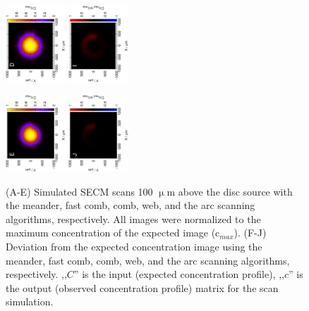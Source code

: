 \documentclass[3p]{elsarticle}
\begin{document}
\begin{figure}
\includegraphics[trim = 20mm 30mm 0mm 20mm, clip, width=0.2\textwidth, angle=-90]{web_sim.eps} \includegraphics[trim = 20mm 30mm 0mm 20mm, clip, width=0.2\textwidth, angle=-90]{web_delta.eps} 

\includegraphics[trim = 20mm 30mm 0mm 20mm, clip, width=0.2\textwidth, angle=-90]{arc_sim.eps} \includegraphics[trim = 20mm 30mm 0mm 20mm, clip, width=0.2\textwidth, angle=-90]{arc_delta.eps} 

\caption{(A-E) Simulated SECM scans 100 $\upmu$m above the disc source with the meander, fast comb, comb, web, and the arc scanning algorithms, respectively. All images were normalized to the maximum concentration of the expected image (c$_{max}$). (F-J) Deviation from the expected concentration image using the meander, fast comb, comb, web, and the arc scanning algorithms, respectively. ,,$C$'' is the input (expected concentration profile), ,,$c$'' is the output (observed concentration profile) matrix for the scan simulation.}
\label{fig:simulations}
\end{figure}
\end{document}

